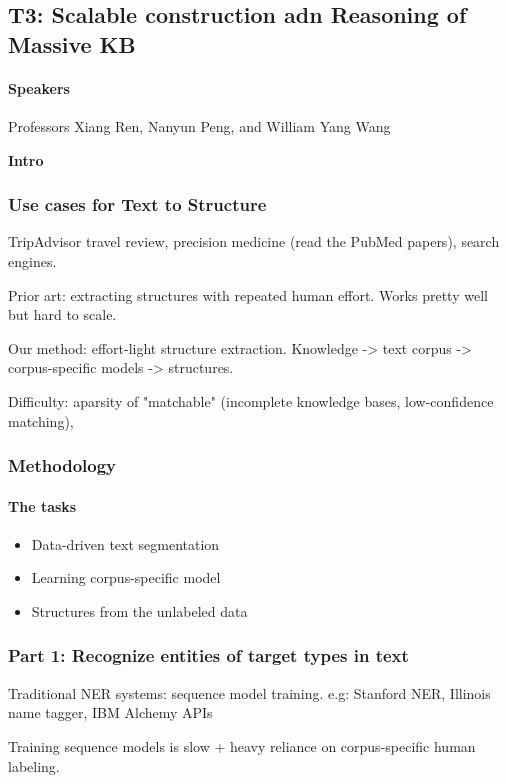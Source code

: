 \subsection{T3: Scalable construction adn Reasoning of Massive KB}
\paragraph{Speakers} Professors Xiang Ren, Nanyun Peng, and William Yang Wang

\textbf{Intro}
\subsubsection{Use cases for Text to Structure} 
TripAdvisor travel review, precision medicine (read the PubMed papers), search engines. 

Prior art: extracting structures with repeated human effort. Works pretty well but hard to scale.

Our method: effort-light structure extraction. Knowledge -> text corpus -> corpus-specific models -> structures.

Difficulty: aparsity of "matchable" (incomplete knowledge bases, low-confidence matching), 

\subsubsection{Methodology}
\paragraph{The tasks}
\begin{itemize}
	\item Data-driven text segmentation
	\item Learning corpus-specific model
	\item Structures from the unlabeled data
\end{itemize}

\subsubsection{Part 1: Recognize entities of target types in text}
Traditional NER systems: sequence model training. e.g: Stanford NER, Illinois name tagger, IBM Alchemy APIs

Training sequence models is slow + heavy reliance on corpus-specific human labeling.

